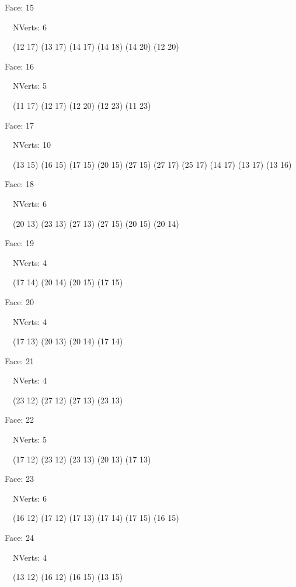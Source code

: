 \documentclass{article}
\begin{document}
{\footnotesize 

Face: 15

\   \    NVerts: 6

 \   \   (12 17) (13 17) (14 17) (14 18) (14 20) (12 20)}

{\footnotesize 

Face: 16

\   \    NVerts: 5

 \   \   (11 17) (12 17) (12 20) (12 23) (11 23)}

{\footnotesize 

Face: 17

\   \    NVerts: 10

 \   \   (13 15) (16 15) (17 15) (20 15) (27 15) (27 17) (25 17) (14 17) (13 17) (13 16)}

{\footnotesize 

Face: 18

\   \    NVerts: 6

 \   \   (20 13) (23 13) (27 13) (27 15) (20 15) (20 14)}

{\footnotesize 

Face: 19

\   \    NVerts: 4

 \   \   (17 14) (20 14) (20 15) (17 15)}

{\footnotesize 

Face: 20

\   \    NVerts: 4

 \   \   (17 13) (20 13) (20 14) (17 14)}

{\footnotesize 

Face: 21

\   \    NVerts: 4

 \   \   (23 12) (27 12) (27 13) (23 13)}

{\footnotesize 

Face: 22

\   \    NVerts: 5

 \   \   (17 12) (23 12) (23 13) (20 13) (17 13)}

{\footnotesize 

Face: 23

\   \    NVerts: 6

 \   \   (16 12) (17 12) (17 13) (17 14) (17 15) (16 15)}

{\footnotesize 

Face: 24

\   \    NVerts: 4

 \   \   (13 12) (16 12) (16 15) (13 15)}
\end{document}
